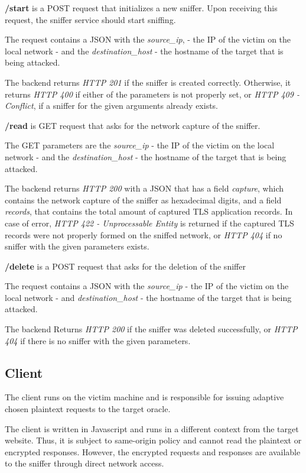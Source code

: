 \textbf{/start} is a POST request that initializes a new sniffer.
Upon receiving this request, the sniffer service should start sniffing.

The request contains a JSON with the \textit{source\_ip}, 
- the IP of the victim on the local network - and the \textit{destination\_host}
- the hostname of the target that is being attacked.

The backend returns \textit{HTTP 201} if the sniffer is created correctly. Otherwise, it returns
\textit{HTTP 400} if either of the parameters is not properly set, or \textit{HTTP 409 -
Conflict}, if a sniffer for the given arguments already exists.

\textbf{/read} is GET request that asks for the network capture of the sniffer.

The GET parameters are the \textit{source\_ip}  - the IP of the victim on the local network -
and the \textit{destination\_host} - the hostname of the target that is being attacked.

The backend returns \textit{HTTP 200} with a JSON that has a field \textit{capture}, which contains the
network capture of the sniffer as hexadecimal digits, and a field \textit{records},
that contains the total amount of captured TLS application records. In case of
error, \textit{HTTP 422 - Unprocessable Entity} is returned if the captured TLS
records were not properly formed on the sniffed network, or \textit{HTTP 404} if no
sniffer with the given parameters exists.

\textbf{/delete} is a POST request that asks for the deletion of the sniffer

The request contains a JSON with the \textit{source\_ip} - the IP of the victim on the local network - 
and \textit{destination\_host} - the hostname of the target that is being attacked.

The backend Returns \textit{HTTP 200} if the sniffer was deleted successfully, or \textit{HTTP 404} if 
there is no sniffer with the given parameters.

\subsection{Client}

The client runs on the victim machine and is responsible for issuing adaptive
chosen plaintext requests to the target oracle.

The client is written in Javascript and runs in a different context from the
target website. Thus, it is subject to same-origin policy and cannot read the
plaintext or encrypted responses. However, the encrypted requests and responses
are available to the sniffer through direct network access.

